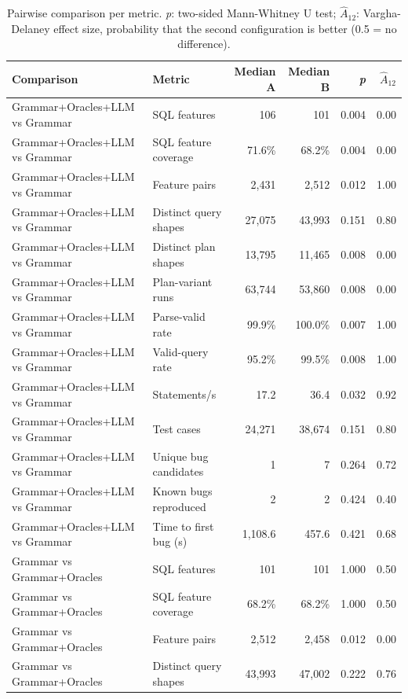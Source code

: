 \begin{table}[t]
  \caption{Pairwise comparison per metric. \emph{p}: two-sided Mann-Whitney U test; \emph{$\hat{A}_{12}$}: Vargha-Delaney effect size, probability that the second configuration is better (0.5 = no difference).}
  \label{tab:rq3-comparison}
  \footnotesize
  \begin{tabular}{llrrrr}
    \toprule
    Comparison & Metric & Median A & Median B & \emph{p} & $\hat{A}_{12}$ \\
    \midrule
    Grammar+Oracles+LLM vs Grammar & SQL features & 106 & 101 & 0.004 & 0.00 \\
    Grammar+Oracles+LLM vs Grammar & SQL feature coverage & 71.6\% & 68.2\% & 0.004 & 0.00 \\
    Grammar+Oracles+LLM vs Grammar & Feature pairs & 2{,}431 & 2{,}512 & 0.012 & 1.00 \\
    Grammar+Oracles+LLM vs Grammar & Distinct query shapes & 27{,}075 & 43{,}993 & 0.151 & 0.80 \\
    Grammar+Oracles+LLM vs Grammar & Distinct plan shapes & 13{,}795 & 11{,}465 & 0.008 & 0.00 \\
    Grammar+Oracles+LLM vs Grammar & Plan-variant runs & 63{,}744 & 53{,}860 & 0.008 & 0.00 \\
    Grammar+Oracles+LLM vs Grammar & Parse-valid rate & 99.9\% & 100.0\% & 0.007 & 1.00 \\
    Grammar+Oracles+LLM vs Grammar & Valid-query rate & 95.2\% & 99.5\% & 0.008 & 1.00 \\
    Grammar+Oracles+LLM vs Grammar & Statements/s & 17.2 & 36.4 & 0.032 & 0.92 \\
    Grammar+Oracles+LLM vs Grammar & Test cases & 24{,}271 & 38{,}674 & 0.151 & 0.80 \\
    Grammar+Oracles+LLM vs Grammar & Unique bug candidates & 1 & 7 & 0.264 & 0.72 \\
    Grammar+Oracles+LLM vs Grammar & Known bugs reproduced & 2 & 2 & 0.424 & 0.40 \\
    Grammar+Oracles+LLM vs Grammar & Time to first bug (s) & 1{,}108.6 & 457.6 & 0.421 & 0.68 \\
    Grammar vs Grammar+Oracles & SQL features & 101 & 101 & 1.000 & 0.50 \\
    Grammar vs Grammar+Oracles & SQL feature coverage & 68.2\% & 68.2\% & 1.000 & 0.50 \\
    Grammar vs Grammar+Oracles & Feature pairs & 2{,}512 & 2{,}458 & 0.012 & 0.00 \\
    Grammar vs Grammar+Oracles & Distinct query shapes & 43{,}993 & 47{,}002 & 0.222 & 0.76 \\

\end{tabular}
\end{table}
